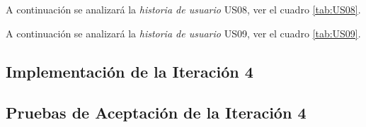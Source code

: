   

  


A continuación se analizará la \emph{historia de usuario} US08, ver el cuadro \ref{tab:US08}.

  

  


  A continuación se analizará la \emph{historia de usuario} US09, ver el cuadro \ref{tab:US09}.

    

    


    \subsection{Implementación de la Iteración 4}


        
%

  \subsection{Pruebas de Aceptación de la Iteración 4}


    
